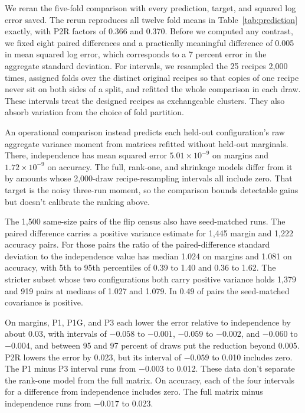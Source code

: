 We reran the five-fold comparison with every prediction, target, and squared log error saved. The rerun reproduces all twelve fold means in Table~\ref{tab:prediction} exactly, with P2R factors of 0.366 and 0.370. Before we computed any contrast, we fixed eight paired differences and a practically meaningful difference of 0.005 in mean squared log error, which corresponds to a 7 percent error in the aggregate standard deviation. For intervals, we resampled the 25 recipes 2,000 times, assigned folds over the distinct original recipes so that copies of one recipe never sit on both sides of a split, and refitted the whole comparison in each draw. These intervals treat the designed recipes as exchangeable clusters. They also absorb variation from the choice of fold partition.

An operational comparison instead predicts each held-out configuration's raw aggregate variance moment from matrices refitted without held-out marginals. There, independence has mean squared error $5.01\times10^{-9}$ on margins and $1.72\times10^{-9}$ on accuracy. The full, rank-one, and shrinkage models differ from it by amounts whose 2,000-draw recipe-resampling intervals all include zero. That target is the noisy three-run moment, so the comparison bounds detectable gains but doesn't calibrate the ranking above.

The 1,500 same-size pairs of the flip census also have seed-matched runs. The paired difference carries a positive variance estimate for 1,445 margin and 1,222 accuracy pairs. For those pairs the ratio of the paired-difference standard deviation to the independence value has median 1.024 on margins and 1.081 on accuracy, with 5th to 95th percentiles of 0.39 to 1.40 and 0.36 to 1.62. The stricter subset whose two configurations both carry positive variance holds 1,379 and 919 pairs at medians of 1.027 and 1.079. In 0.49 of pairs the seed-matched covariance is positive.

On margins, P1, P1G, and P3 each lower the error relative to independence by about 0.03, with intervals of $-0.058$ to $-0.001$, $-0.059$ to $-0.002$, and $-0.060$ to $-0.004$, and between 95 and 97 percent of draws put the reduction beyond 0.005. P2R lowers the error by 0.023, but its interval of $-0.059$ to 0.010 includes zero. The P1 minus P3 interval runs from $-0.003$ to 0.012. These data don't separate the rank-one model from the full matrix. On accuracy, each of the four intervals for a difference from independence includes zero. The full matrix minus independence runs from $-0.017$ to 0.023.

